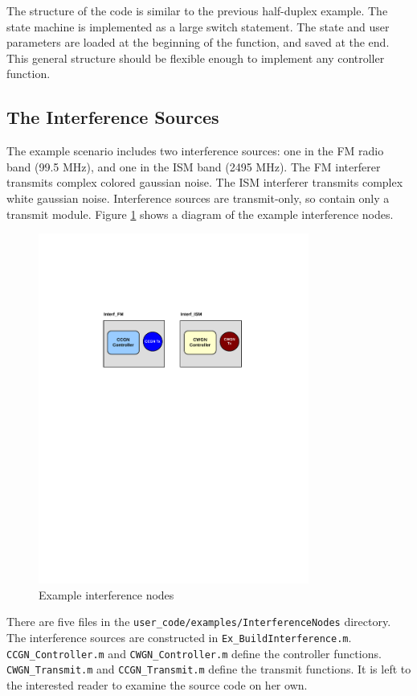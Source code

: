 The structure of the code is similar to the previous half-duplex
example.  The state machine is implemented as a large switch
statement.  The state and user parameters are loaded at the
beginning of the function, and saved at the end.  This general
structure should be flexible enough to implement any controller
function.

\subsection{The Interference Sources}
\label{sec:interference_source}
The example scenario includes two interference sources: one in the
FM radio band (99.5 MHz), and one in the ISM band (2495 MHz). The FM
interferer transmits complex colored gaussian noise. The ISM
interferer transmits complex white gaussian noise. Interference
sources are transmit-only, so contain only a transmit module. Figure
\ref{fig:interfNodes} shows a diagram of the example interference
nodes.

\begin{figure}[h]
\centering
\includegraphics[width=3.5in]{figs/Interf_Example}
\caption{Example interference nodes} \label{fig:interfNodes}
\end{figure}

There are five files in the \verb+user_code/examples/InterferenceNodes+
directory. The interference sources are constructed in
\verb+Ex_BuildInterference.m+.  \verb+CCGN_Controller.m+ and
\verb+CWGN_Controller.m+ define the controller functions.
\verb+CWGN_Transmit.m+ and \verb+CCGN_Transmit.m+ define the
transmit functions. It is left to the interested reader to examine
the source code on her own.

